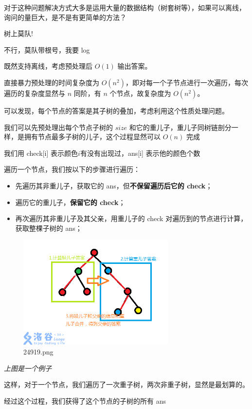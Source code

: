对于这种问题解决方式大多是运用大量的数据结构（树套树等），如果可以离线，询问的量巨大，是不是有更简单的方法？

树上莫队!

不行，莫队带根号，我要 log

既然支持离线，考虑预处理后 $O(1)$ 输出答案。

直接暴力预处理的时间复杂度为 $O(n^2)$，即对每一个子节点进行一次遍历，每次遍历的复杂度显然与 $n$ 同阶，有 $n$ 个节点，故复杂度为 $O(n^2)$。

可以发现，每个节点的答案是其子树的叠加，考虑利用这个性质处理问题。

我们可以先预处理出每个节点子树的 $size$ 和它的重儿子，重儿子同树链剖分一样，是拥有节点最多子树的儿子，这个过程显然可以 $O(n)$ 完成

我们用 check[i] 表示颜色$i$有没有出现过，ans[i] 表示他的颜色个数

遍历一个节点，我们按以下的步骤进行遍历：

\begin{itemize}
\item 先遍历其非重儿子，获取它的 ans，但\textbf{不保留遍历后它的 check}；
\item 遍历它的重儿子，\textbf{保留它的 check}；
\item 再次遍历其非重儿子及其父亲，用重儿子的 check 对遍历到的节点进行计算，获取整棵子树的 ans；
\end{itemize}

\begin{figure}[htbp]
\centering
\includegraphics[width=0.7\textwidth]{docs/misc/images/24919.png} 
\caption{24919.png}
\end{figure}    

{\em 上图是一个例子 }

这样，对于一个节点，我们遍历了一次重子树，两次非重子树，显然是最划算的。

经过这个过程，我们获得了这个节点的子树的所有 ans

